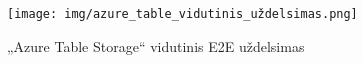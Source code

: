 \begin{figure}[htp!]
\hspace{-1cm}
\centering
\texttt{[image: img/azure\_table\_vidutinis\_uždelsimas.png]}
\caption{„Azure Table Storage“ vidutinis E2E uždelsimas}
\label{fig:e2e_latency_table_storage}
\end{figure}